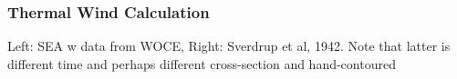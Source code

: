 \documentclass[xcolor=dvipsnames]{beamer}
\begin{document}
\begin{frame}
\frametitle{Thermal Wind Calculation}

{\small Left: SEA w data from WOCE, Right: Sverdrup et al, 1942.  Note that latter is different time and perhaps different cross-section and hand-contoured}
\label{florida_straits_2}
\end{frame}
\end{document}
